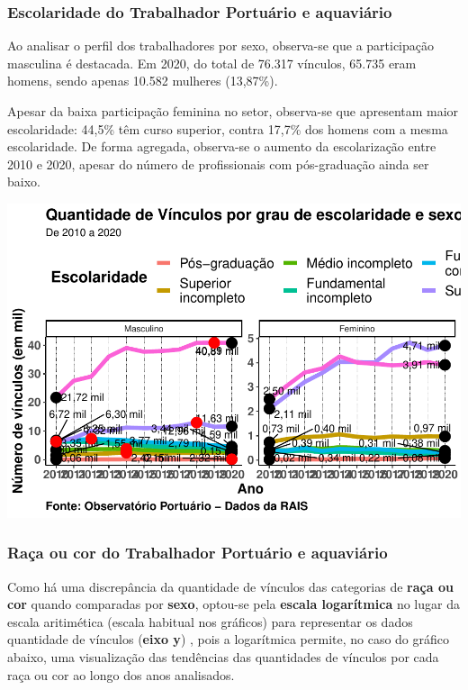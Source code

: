 \documentclass[
]{article}
\begin{document}
\hypertarget{escolaridade-do-trabalhador-portuuxe1rio-e-aquaviuxe1rio}{%
\subsubsection{Escolaridade do Trabalhador Portuário e
aquaviário}\label{escolaridade-do-trabalhador-portuuxe1rio-e-aquaviuxe1rio}}

Ao analisar o perfil dos trabalhadores por sexo, observa-se que a
participação masculina é destacada. Em 2020, do total de 76.317
vínculos, 65.735 eram homens, sendo apenas 10.582 mulheres (13,87\%).

Apesar da baixa participação feminina no setor, observa-se que
apresentam maior escolaridade: 44,5\% têm curso superior, contra 17,7\%
dos homens com a mesma escolaridade. De forma agregada, observa-se o
aumento da escolarização entre 2010 e 2020, apesar do número de
profissionais com pós-graduação ainda ser baixo.

\includegraphics{mercado_trabalho_files/figure-latex/g_operacao_escol_sexo-1.pdf}

\hypertarget{rauxe7a-ou-cor-do-trabalhador-portuuxe1rio-e-aquaviuxe1rio}{%
\subsubsection{Raça ou cor do Trabalhador Portuário e
aquaviário}\label{rauxe7a-ou-cor-do-trabalhador-portuuxe1rio-e-aquaviuxe1rio}}

Como há uma discrepância da quantidade de vínculos das categorias de
\textbf{raça ou cor} quando comparadas por \textbf{sexo}, optou-se pela
\textbf{escala logarítmica} no lugar da escala aritimética (escala
habitual nos gráficos) para representar os dados quantidade de vínculos
(\textbf{eixo y}) , pois a logarítmica permite, no caso do gráfico
abaixo, uma visualização das tendências das quantidades de vínculos por
cada raça ou cor ao longo dos anos analisados.
\end{document}

